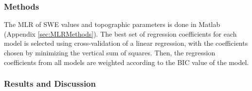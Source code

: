 \documentclass{sfuthesis}
\begin{document}
\subsubsection{Methods}

The MLR of SWE values and topographic parameters is done in Matlab (Appendix \ref{sec:MLRMethods}). The best set of regression coefficients for each model is selected using cross-validation of a linear regression, with the coefficients chosen by minimizing the vertical sum of squares. Then, the regression coefficients from all models are weighted according to the BIC value of the model.

\subsubsection{Results and Discussion}
\end{document}
